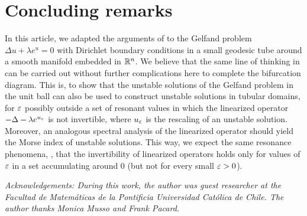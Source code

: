 \section{Concluding remarks}

In this article, we adapted the arguments of
\cite{Pacard2014,stable-solutions-elliptic} to the Gelfand problem $\Delta u +
\lambda e^u=0$ with Dirichlet boundary conditions in a small geodesic tube
around a smooth manifold embedded in $\mathbb{R}^n$.
We believe that the same line of thinking in \cite{Pacard2014} can be
carried out without further complications here to complete the bifurcation diagram.
This is, to show that the unstable
solutions of the Gelfand problem in the unit ball can also be used to construct
unstable solutions in tubular domains, for $\varepsilon$ possibly outside a set of
resonant values in which the linearized operator $-\Delta - \lambda e^{u_\varepsilon}$ 
is not invertible, where $u_\varepsilon$ is the rescaling of an unstable solution. Moreover,
an analogous spectral analysis of the linearized operator should yield the
Morse index of unstable solutions. This way, we expect the same resonance phenomena,
\ie, that the invertibility of linearized operators holds only for values of $\varepsilon$
in a set accumulating around 0 (but not for every small $\varepsilon>0$).

\medskip 

\textit{Acknowledgements: During this work, the author was guest
    researcher at the Facultad de Matem\'aticas de la Pontificia Universidad
    Cat\'olica de Chile. The author thanks Monica Musso and Frank Pacard.}
